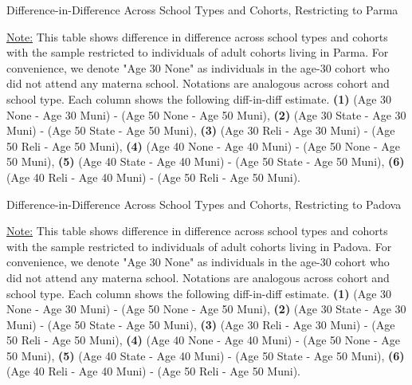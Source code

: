 \documentclass[11pt]{article}
\begin{document}
\begin{table}[H]
\begin{center}
	\caption{Difference-in-Difference Across School Types and Cohorts, Restricting to Parma}
	\scalebox{0.83}{
		}
\end{center}
\footnotesize
\underline{Note:} This table shows difference in difference across school types and cohorts with the sample restricted to individuals of adult cohorts living in Parma. For convenience, we denote "Age 30 None" as individuals in the age-30 cohort who did not attend any materna school. Notations are analogous across cohort and school type. Each column shows the following diff-in-diff estimate. \textbf{(1)} (Age 30 None - Age 30 Muni) - (Age 50 None - Age 50 Muni), \textbf{(2)} (Age 30 State - Age 30 Muni) - (Age 50 State - Age 50 Muni), \textbf{(3)} (Age 30 Reli - Age 30 Muni) - (Age 50 Reli - Age 50 Muni), \textbf{(4)} (Age 40 None - Age 40 Muni) - (Age 50 None - Age 50 Muni),  \textbf{(5)} (Age 40 State - Age 40 Muni) - (Age 50 State - Age 50 Muni), \textbf{(6)} (Age 40 Reli - Age 40 Muni) - (Age 50 Reli - Age 50 Muni). 
\end{table}

\begin{table}[H]
\begin{center}
	\caption{Difference-in-Difference Across School Types and Cohorts, Restricting to Padova}
	\scalebox{0.83}{
		}
\end{center}
\footnotesize
\underline{Note:} This table shows difference in difference across school types and cohorts with the sample restricted to individuals of adult cohorts living in Padova. For convenience, we denote "Age 30 None" as individuals in the age-30 cohort who did not attend any materna school. Notations are analogous across cohort and school type. Each column shows the following diff-in-diff estimate. \textbf{(1)} (Age 30 None - Age 30 Muni) - (Age 50 None - Age 50 Muni), \textbf{(2)} (Age 30 State - Age 30 Muni) - (Age 50 State - Age 50 Muni), \textbf{(3)} (Age 30 Reli - Age 30 Muni) - (Age 50 Reli - Age 50 Muni), \textbf{(4)} (Age 40 None - Age 40 Muni) - (Age 50 None - Age 50 Muni),  \textbf{(5)} (Age 40 State - Age 40 Muni) - (Age 50 State - Age 50 Muni), \textbf{(6)} (Age 40 Reli - Age 40 Muni) - (Age 50 Reli - Age 50 Muni). 
\end{table}
\end{document}
